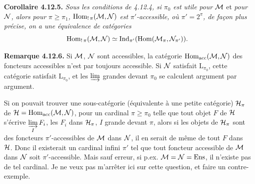 \textbf{Corollaire 4.12.5.} \textit{Sous les conditions de 4.12.4, si $\pi_0$ est utile pour $\mathcal{M}$} et \textit{pour $\mathcal{N}$, alors pour $\pi \geqslant \pi_1$, $\operatorname{Hom}_{!\,\pi}(\mathcal{M},\mathcal{N})$ est $\pi'$-accessible, où $\pi' = 2^\pi$, de façon plus précise, on a une équivalence de catégories}
\[
\operatorname{Hom}_{!\,\pi}(\mathcal{M},\mathcal{N}) \simeq \mathrm{Ind}_{\pi'}(\operatorname{Hom}(\mathcal{M}_\pi,\mathcal{N}_{\pi'})) .
\]

\textbf{Remarque 4.12.6.} Si $\mathcal{M}$, $\mathcal{N}$ sont accessibles, la catégorie $\operatorname{Hom}_{\mathrm{acc}}(\mathcal{M},\mathcal{N})$ des foncteurs accessibles n'est par toujours accessible. Si $\mathcal{N}$ satisfait $\mathrm{L}_{\pi_0}$, cette catégorie satisfait $\mathrm{L}_{\pi_0}$, %
et les $\varinjlim$ grandes devant $\pi_0$ se calculent argument par argument.

Si on pouvait trouver une sous-catégorie (équivalente à une petite catégorie) $\mathcal{H}_\pi$ de $\mathcal{H} = \operatorname{Hom}_{\mathrm{acc}}(\mathcal{M},\mathcal{N})$, pour un cardinal $\pi \geqslant \pi_0$ telle que tout objet $F$ de $\mathcal{H}$ s'écrive $\varinjlim\limits_{I} F_i$, les $F_i$ dans $\mathcal{H}_\pi$, $I$ grande devant $\pi$, alors si les objets de $\mathcal{H}_\pi$ sont des foncteurs $\pi'$-accessibles de $\mathcal{M}$ dans $\mathcal{N}$, il en serait de même de tout $F$ dans $\mathcal{H}$. Donc il existerait un cardinal infini $\pi'$ tel que tout foncteur accessible de $\mathcal{M}$ dans $\mathcal{N}$ soit $\pi'$-accessible. Mais sauf erreur, si p.ex. $\mathcal{M} = \mathcal{N} = \mathrm{Ens}$, il n'existe pas de tel cardinal. Je ne veux pas m'arrêter ici sur cette question, et faire un contre-exemple.


